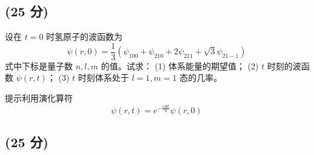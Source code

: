 \subsection{(25 分)}
设在 \( t=0 \) 时氢原子的波函数为
\[\psi(r, 0) = \frac{1}{3} \left( \psi_{100} + \psi_{210} + 2 \psi_{211} + \sqrt{3} \psi_{21-1} \right)~\]
式中下标是量子数 \( n, l, m \) 的值。试求：
(1) 体系能量的期望值；
(2) \( t \) 时刻的波函数 \( \psi(r,t) \)；
(3) \( t \) 时刻体系处于 \( l=1, m=1 \) 态的几率。

提示利用演化算符
\[\psi(r,t) = e^{-\frac{i H t}{\hbar}} \psi(r,0)~\]
\subsection{(25 分)}